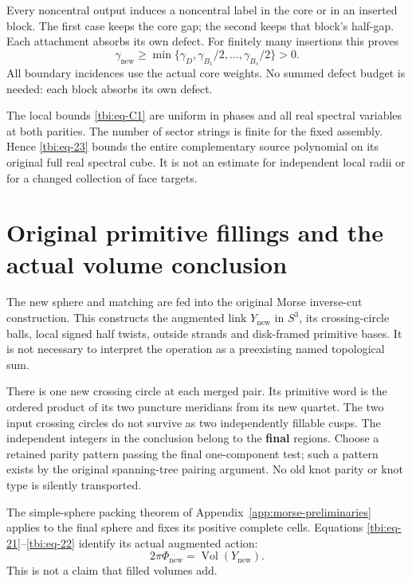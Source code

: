 Every noncentral output induces a noncentral label in the core or in
an inserted block. The first case keeps the core gap; the second keeps
that block's half-gap. Each attachment absorbs its own defect.
For finitely many insertions this proves
\begin{equation}\label{tbi:eq-23}
\gamma_{\mathrm{new}}\ge
\min\{\gamma_D,\gamma_{B_1}/2,\ldots,\gamma_{B_s}/2\}>0.
\end{equation}
All boundary incidences use the actual core weights. No summed defect budget is needed: each block absorbs its own defect.

The local bounds \eqref{tbi:eq-C1} are uniform in phases and all real spectral variables at both parities. The number of sector strings is finite for the fixed assembly. Hence \eqref{tbi:eq-23} bounds the entire complementary source polynomial on its original full real spectral cube. It is not an estimate for independent local radii or for a changed collection of face targets.

\section{Original primitive fillings and the actual volume conclusion}\label{tbi:sec-7}

The new sphere and matching are fed into the original Morse inverse-cut construction. This constructs the augmented link \(Y_{\mathrm{new}}\) in \(S^3\), its crossing-circle balls, local signed half twists, outside strands and disk-framed primitive bases. It is not necessary to interpret the operation as a preexisting named topological sum.

There is one new crossing circle at each merged pair. Its primitive word is the ordered product of its two puncture meridians from its new quartet. The two input crossing circles do not survive as two independently fillable cusps. The independent integers in the conclusion belong to the \textbf{final} regions. Choose a retained parity pattern passing the final one-component test; such a pattern exists by the original spanning-tree pairing argument. No old knot parity or knot type is silently transported.

The simple-sphere packing theorem of Appendix~\ref{app:morse-preliminaries} applies to the final sphere and fixes its positive complete cells. Equations \eqref{tbi:eq-21}--\eqref{tbi:eq-22} identify its actual augmented action:
\begin{equation}\label{tbi:eq-24}
2\pi\Phi_{\mathrm{new}}=\operatorname{Vol}(Y_{\mathrm{new}}).
\end{equation}
This is not a claim that filled volumes add.

